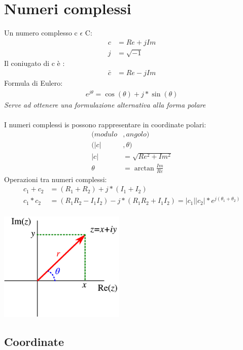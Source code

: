 \documentclass[a4paper]{article}
\begin{document}
		\newpage
		\section{Numeri complessi}
			Un numero complesso c $\epsilon$  C:
			\begin{align*}
			c &= Re + jIm\\
			j &= \sqrt{-1}
			\end{align*}
			Il coniugato di c è :
			\begin{align*}
			\bar{c} &= Re -jIm
			\end{align*}
			Formula di Eulero:
			\begin{align*}
			e^{j\theta} = \cos(\theta) + j*\sin(\theta)
			\end{align*}
			\textit{Serve ad ottenere una formulazione alternativa alla forma polare}\\\\
			I numeri complessi is possono rappresentare in coordinate polari:
			\begin{align*}
			(modulo &, angolo)\\
			(|c|&,\theta)\\
			|c|&=\sqrt{Re^2+Im^2}\\
			\theta&=\arctan{\frac{Im}{Re}}
			\end{align*}
			Operazioni tra numeri complessi:
			\begin{align*}
			c_{1} + c_{2}&=(R_{1} + R_{2}) + j*(I_{1} + I_{2})\\
			c_{1} * c_{2}&=(R_{1}R_{2}-I_{1}I_{2}) - j*(R_{1}R_{2}+I_{1}I_{2})=|c_{1}||c_{2}|*e^{j(\theta_{1}+\theta_{2})}\\
			\end{align*}
			\bigskip
			\begin{center}
			\includegraphics[width=6cm]{img/complex.png}
			\end{center}
			
			
	\newpage
	\subsection{Coordinate}
\end{document}
